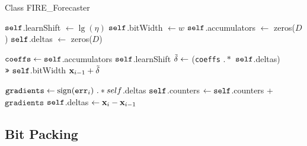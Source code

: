 
\begin{algorithm}[h]
\caption{Class FIRE\_Forecaster} \label{algo:xff}
\begin{algorithmic}[1]

 \label{line:xffCtor}
\State $\texttt{self}$.learnShift $\leftarrow \lg(\eta)$
\State $\texttt{self}$.bitWidth $\leftarrow w$ 
\State $\texttt{self}$.accumulators $\leftarrow $ zeros($D$) \label{line:counter}
\State $\texttt{self}$.deltas $\leftarrow $ zeros($D$) \label{line:deltas}
\EndFunction

\State $\texttt{coeffs} \leftarrow \texttt{self}$.accumulators \rshift $\texttt{self}$.learnShift
\State $\tilde{\mathbf{\delta}} \leftarrow$ (\texttt{coeffs} $.*$ $\texttt{self}$.deltas) $\texttt{>>}\text{ } \texttt{self}$.bitWidth
\RETURN $\mathbf{x}_{i-1} + \tilde{\mathbf{\delta}}$
\EndFunction

\State $\texttt{gradients} \leftarrow \operatorname{sign}(\texttt{err}_i) \text{ } .* self$.deltas
\State $\texttt{self}$.counters $\leftarrow \texttt{self}$.counters + $\texttt{gradients}$
\State $\texttt{self}$.deltas $\leftarrow \mathbf{x}_{i} - \mathbf{x}_{i-1}$
\EndFunction


\end{algorithmic}
\end{algorithm}






\subsection{Bit Packing} \label{sec:bitpacking}

